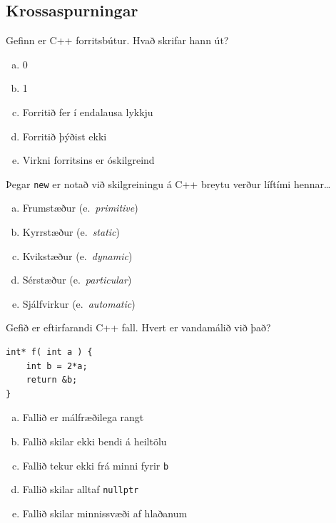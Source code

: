 \documentclass[addpoints]{exam}
\newcommand{\eng}[1]{(e.\ \emph{#1})}
\begin{document}
\begin{questions}

	\section{Krossaspurningar}

	\question[3]

	Gefinn er C++ forritsbútur. Hvað skrifar hann út?
	\begin{multicols}{2}


		\begin{enumerate}[a)]
			\item 0
			\item 1
			\item Forritið fer í endalausa lykkju
			\item Forritið þýðist ekki
			\item Virkni forritsins er óskilgreind %
		\end{enumerate}
	\end{multicols}

	\question[3] Þegar \texttt{new} er notað við skilgreiningu á C++ breytu verður líftími hennar\ldots

	\begin{enumerate}[a)]
		\item Frumstæður \eng{primitive}
		\item Kyrrstæður \eng{static}
		\item Kvikstæður \eng{dynamic} %
		\item Sérstæður \eng{particular}
		\item Sjálfvirkur \eng{automatic}
	\end{enumerate}

	\question[3]
	Gefið er eftirfarandi C++ fall. Hvert er vandamálið við það?

	\begin{multicols}{2}
		\begin{verbatim}
int* f( int a ) {
    int b = 2*a;
    return &b;
}
        \end{verbatim}

		\begin{enumerate}[a)]
			\item Fallið er málfræðilega rangt
			\item Fallið skilar ekki bendi á heiltölu
			\item Fallið tekur ekki frá minni fyrir \texttt{b}
			\item Fallið skilar alltaf \texttt{nullptr}
			\item Fallið skilar minnissvæði af hlaðanum %
		\end{enumerate}
	\end{multicols}


\end{questions}
\end{document}
